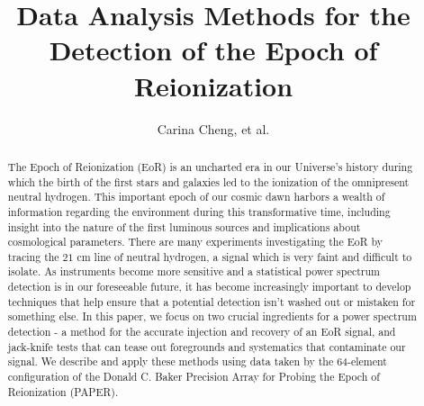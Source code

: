 \documentclass[preprint2,numberedappendix,tighten,twocolappendix]{aastex6}  %
\begin{document}
\title{Data Analysis Methods for the Detection of the Epoch of Reionization}

\author{
Carina Cheng,
et al.
}


	






\begin{abstract}
The Epoch of Reionization (EoR) is an uncharted era in our Universe's history during which the birth of the first stars and galaxies led to the ionization of the omnipresent neutral hydrogen. This important epoch of our cosmic dawn harbors a wealth of information regarding the environment during this transformative time, including insight into the nature of the first luminous sources and implications about cosmological parameters. There are many experiments investigating the EoR by tracing the $21$ cm line of neutral hydrogen, a signal which is very faint and difficult to isolate. As instruments become more sensitive and a statistical power spectrum detection is in our foreseeable future, it has become increasingly important to develop techniques that help ensure that a potential detection isn't washed out or mistaken for something else. In this paper, we focus on two crucial ingredients for a power spectrum detection - a method for the accurate injection and recovery of an EoR signal, and jack-knife tests that can tease out foregrounds and systematics that contaminate our signal. We describe and apply these methods using data taken by the 64-element configuration of the Donald C. Baker Precision Array for Probing the Epoch of Reionization (PAPER).
\end{abstract}
\end{document}
